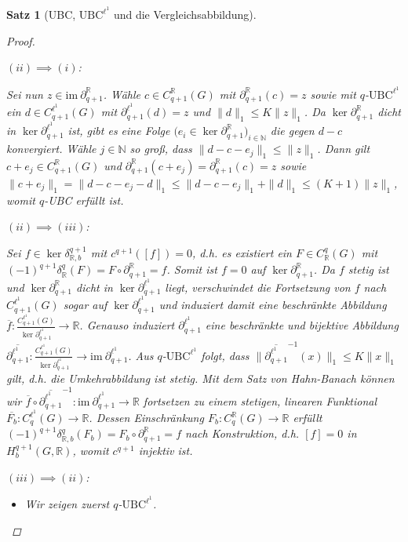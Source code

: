 \documentclass[a4paper,twoside,10pt]{scrreprt}
\newcommand {\img}{\text{im}~}
\newcommand{\N}{\mathbb{N}}
\newcommand{\R}{\mathbb{R}}
\newtheorem{satz}{Satz}[section]
\theoremstyle{definition}
\begin{document}
\begin{satz}[UBC, $\text{UBC}^{\ell^1}$ und die Vergleichsabbildung]
\begin{proof}
\begin{itemize}
\end{itemize}
$(ii)\implies(i)$:\par
Sei nun $z\in \img \partial_{q+1}^{\R}$. Wähle $c\in C_{q+1}^{\R}(G)$ mit $ \partial_{q+1}^{\R}(c)=z$ sowie mit $q$-$\text{UBC}^{\ell^1}$ ein $d\in C_{q+1}^{\ell^1}(G)$ mit $\partial_{q+1}^{\ell^1}(d)=z$ und $\|d\|_1\leq K\|z\|_1$. Da $\ker \partial_{q+1}^{\R}$ dicht in $\ker \partial_{q+1}^{\ell^1}$ ist, gibt es eine Folge $\bigl(e_i\in \ker \partial_{q+1}^{\R}\bigr)_{i\in\N}$ die gegen $d-c$ konvergiert. Wähle $j\in \N$ so groß, dass $\|d-c-e_j\|_1\leq \|z\|_1$. Dann gilt $c+e_j\in C_{q+1}^{\R}(G)$ und $\partial_{q+1}^{\R}(c+e_j)=\partial_{q+1}^{\R}(c)=z$ sowie $\|c+e_j\|_1=\|d-c-e_j-d\|_1\leq \|d-c-e_j\|_1+\|d\|_1\leq (K+1)\|z\|_1$, womit $q$-UBC erfüllt ist.\par\noindent
$(ii)\implies (iii)$:\par
Sei $f\in \ker \delta_{\R,b}^{q+1}$ mit $c^{q+1}([f])=0$, d.h. es existiert ein $F\in C_{\R}^q(G)$ mit $(-1)^{q+1}\delta_{\R}^q(F)=F\circ \partial_{q+1}^{\R}=f$. Somit ist $f=0$ auf $\ker \partial_{q+1}^{\R}$. Da $f$ stetig ist und $\ker \partial_{q+1}^{\R}$ dicht in $\ker \partial_{q+1}^{\ell^1}$ liegt, verschwindet die Fortsetzung von $f$ nach $C^{\ell^1}_{q+1}(G)$ sogar auf $\ker \partial_{q+1}^{\ell^1}$ und induziert damit eine beschränkte Abbildung $\overline{f}:\frac{C_{q+1}^{\ell^1}(G)}{\ker \partial_{q+1}^{\ell^1}}\to \R$. Genauso induziert $\partial_{q+1}^{\ell^1}$ eine beschränkte und bijektive Abbildung $\overline{\partial_{q+1}^{\ell^1}}:\frac{C_{q+1}^{\ell^1}(G)}{\ker \partial_{q+1}^{\ell^1}}\to \img \partial_{q+1}^{\ell^1}$. Aus $q$-$\text{UBC}^{\ell^1}$ folgt, dass $\|\overline{\partial_{q+1}^{\ell^1}}^{-1}(x)\|_1\leq K\|x\|_1$ gilt, d.h. die Umkehrabbildung ist stetig. Mit dem Satz von Hahn-Banach können wir $\overline{f}\circ \overline{\partial_{q+1}^{\ell^1}}^{-1}:\img \partial_{q+1}^{\ell^1}\to \R$ fortsetzen zu einem stetigen, linearen Funktional $\overline{F_b}:C_q^{\ell^1}(G)\to \R$. Dessen Einschränkung $F_b:C^{\R}_q(G)\to \R$ erfüllt $(-1)^{q+1}\delta_{\R,b}^q(F_b)=F_b\circ \partial_{q+1}^{\R}=f$ nach Konstruktion, d.h. $[f]=0$ in $H_b^{q+1}(G,\R)$, womit $c^{q+1}$ injektiv ist.\par\noindent
$(iii)\implies (ii)$:
\begin{itemize}
\item Wir zeigen zuerst $q$-$\text{UBC}^{\ell^1}$.\par

\end{itemize}
\end{proof}
\end{satz}
\end{document}
